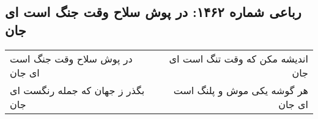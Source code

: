 \begin{center}
\section*{رباعی شماره ۱۴۶۲: در پوش سلاح وقت جنگ است ای جان}
\label{sec:1462}
\begin{longtable}{l p{0.5cm} r}
در پوش سلاح وقت جنگ است ای جان
&&
اندیشه مکن که وقت تنگ است ای جان
\\
بگذر ز جهان که جمله رنگست ای جان
&&
هر گوشه یکی موش و پلنگ است ای جان
\\
\end{longtable}
\end{center}
